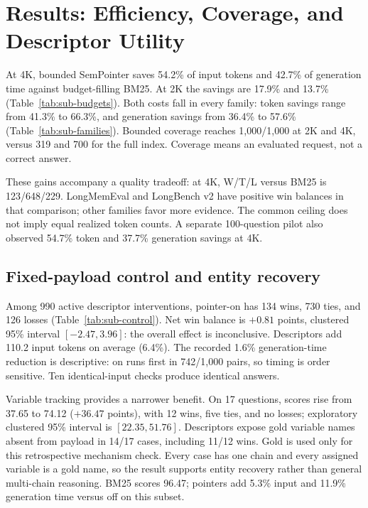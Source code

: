 \documentclass[runningheads]{llncs}
\begin{document}
\section{Results: Efficiency, Coverage, and Descriptor Utility}


At 4K, bounded SemPointer saves 54.2\% of input tokens and 42.7\% of generation time against budget-filling BM25. At 2K the savings are 17.9\% and 13.7\% (Table~\ref{tab:sub-budgets}). Both costs fall in every family: token savings range from 41.3\% to 66.3\%, and generation savings from 36.4\% to 57.6\% (Table~\ref{tab:sub-families}). Bounded coverage reaches 1,000/1,000 at 2K and 4K, versus 319 and 700 for the full index. Coverage means an evaluated request, not a correct answer.

These gains accompany a quality tradeoff: at 4K, W/T/L versus BM25 is 123/648/229. LongMemEval and LongBench v2 have positive win balances in that comparison; other families favor more evidence. The common ceiling does not imply equal realized token counts. A separate 100-question pilot also observed 54.7\% token and 37.7\% generation savings at 4K.

\subsection{Fixed-payload control and entity recovery}

Among 990 active descriptor interventions, pointer-on has 134 wins, 730 ties, and 126 losses (Table~\ref{tab:sub-control}). Net win balance is $+0.81$ points, clustered 95\% interval $[-2.47,3.96]$: the overall effect is inconclusive. Descriptors add 110.2 input tokens on average (6.4\%). The recorded 1.6\% generation-time reduction is descriptive: on runs first in 742/1,000 pairs, so timing is order sensitive. Ten identical-input checks produce identical answers.

Variable tracking provides a narrower benefit. On 17 questions, scores rise from 37.65 to 74.12 ($+36.47$ points), with 12 wins, five ties, and no losses; exploratory clustered 95\% interval is $[22.35,51.76]$. Descriptors expose gold variable names absent from payload in 14/17 cases, including 11/12 wins. Gold is used only for this retrospective mechanism check. Every case has one chain and every assigned variable is a gold name, so the result supports entity recovery rather than general multi-chain reasoning. BM25 scores 96.47; pointers add 5.3\% input and 11.9\% generation time versus off on this subset.
\end{document}
